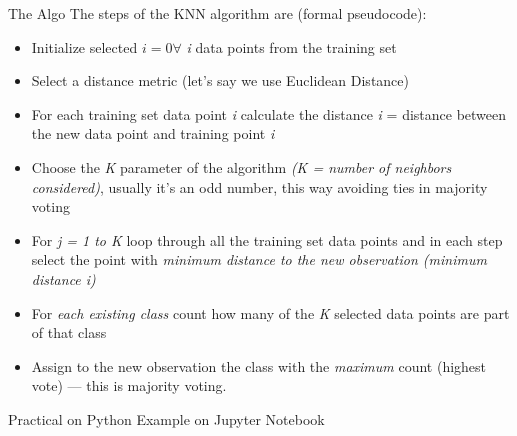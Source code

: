 \documentclass{beamer}
\begin{document}
\begin{frame}{The Algo}
    The steps of the KNN algorithm are (formal pseudocode):
\begin{itemize}
    \item Initialize selected $i = 0 \forall $  \textit{i} data points from the training set
    \item Select a distance metric (let’s say we use Euclidean Distance) 
    \item For each training set data point \textit{i} calculate the distance \textit{i} = distance between the new data point and training point \textit{i}
    \item Choose the \textit{K} parameter of the algorithm \textit{(K = number of neighbors considered)}, usually it’s an odd number, this way avoiding ties in majority voting
    \item For \textit{j = 1 to K} loop through all the training set data points and in each step select the point with \textit{minimum distance to the new observation (minimum distance i)}
    \item For \textit{each existing class} count how many of the \textit{K} selected data points are part of that class 
    \item Assign to the new observation the class with the \textit{maximum} count (highest vote) — this is majority voting.
\end{itemize}


\end{frame}

\begin{frame}{Practical on Python}
    Example on Jupyter Notebook
\end{frame}




% 


    

\end{document}
